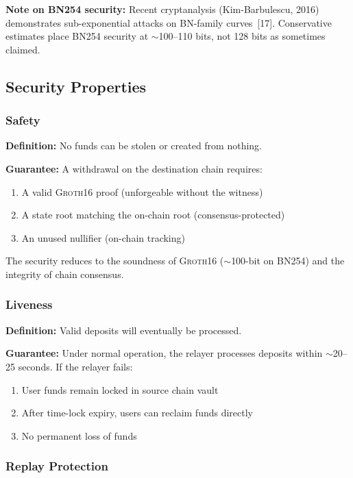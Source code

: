 \documentclass[11pt,a4paper,twoside]{article}
\newcommand{\groth}{\textsc{Groth16}}
\begin{document}
\textbf{Note on BN254 security:} Recent cryptanalysis (Kim-Barbulescu, 2016) demonstrates sub-exponential attacks on BN-family curves~[17]. Conservative estimates place BN254 security at $\sim$100--110 bits, not 128 bits as sometimes claimed.

\subsection{Security Properties}

\subsubsection{Safety}

\textbf{Definition:} No funds can be stolen or created from nothing.

\textbf{Guarantee:} A withdrawal on the destination chain requires:
\begin{enumerate}
    \item A valid \groth{} proof (unforgeable without the witness)
    \item A state root matching the on-chain root (consensus-protected)
    \item An unused nullifier (on-chain tracking)
\end{enumerate}

The security reduces to the soundness of \groth{} ($\sim$100-bit on BN254) and the integrity of chain consensus.

\subsubsection{Liveness}

\textbf{Definition:} Valid deposits will eventually be processed.

\textbf{Guarantee:} Under normal operation, the relayer processes deposits within $\sim$20--25 seconds. If the relayer fails:
\begin{enumerate}
    \item User funds remain locked in source chain vault
    \item After time-lock expiry, users can reclaim funds directly
    \item No permanent loss of funds
\end{enumerate}

\subsubsection{Replay Protection}
\end{document}
